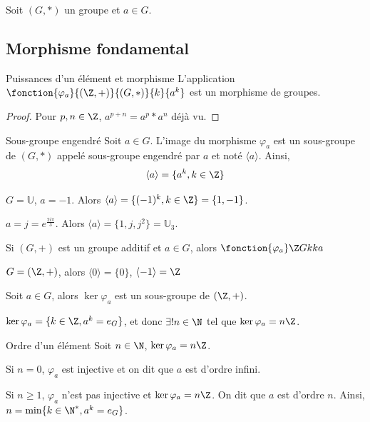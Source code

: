 Soit $(G, \ast)$ un groupe et $a \in G$.

\subsection{Morphisme fondamental}
\begin{theoreme}{Puissances d'un élément et morphisme}{}
    L'application $\fonction{\varphi_a}{(\Z, +)}{(G, \ast)}{k}{a^k}$ est un morphisme de groupes.
\end{theoreme}

\begin{proof}
    Pour $p, n \in \Z$, $a^{p + n} = a^p \ast a^n$ déjà vu. 
\end{proof}

\begin{definition}{Sous-groupe engendré}{}
    Soit $a \in G$. 
    L'image du morphisme $\varphi_a$ est un sous-groupe de $(G, \ast)$ appelé
    sous-groupe engendré par $a$ et noté $\langle a \rangle$. 
    Ainsi, 
    $$\langle a \rangle = \{a^k, k \in \Z\}$$
\end{definition}

\begin{exemple}
    $G = \mathbb U$, $a = -1$. 
    Alors $\langle a \rangle = \{(-1)^k, k \in \Z\} = \{1, -1\}$.

    $\displaystyle a = j = e^{\frac{2i\pi}3}$.
    Alors $\langle a \rangle = \{1, j, j^2\} = \mathbb U_3$.
\end{exemple}


\begin{remarque}
    Si $(G, +)$ est un groupe additif et $a \in G$, alors 
    $\fonction {\varphi_a} \Z G k {ka}$ 
\end{remarque}

\begin{exemple}
    $G = (\Z, +)$, alors $\langle 0 \rangle = \{0\}$, $\langle -1 \rangle = \Z$
\end{exemple}

\begin{definition}{}{}
    Soit $a \in G$, alors $\ker \varphi_a$ est un sous-groupe de $(\Z, +)$. 

    $\ker \varphi_a = \{k \in \Z, a^k = e_G\}$, et donc 
    $\exists ! n \in \N$ tel que $\ker \varphi_a = n \Z$. 
\end{definition}

\begin{definition}{Ordre d'un élément}{}
    Soit $n \in \N$, 
    $\ker \varphi_a = n\Z$. 

    Si $n = 0$, $\varphi_a$ est injective et on dit que $a$ est d'ordre infini.

    Si $n \geq 1$, $\varphi_a$ n'est pas injective et $\ker \varphi_a = n \Z$.
    On dit que $a$ est d'ordre $n$. Ainsi, $n = \min \{k \in \N^*, a^k = e_G\}$.
\end{definition}

